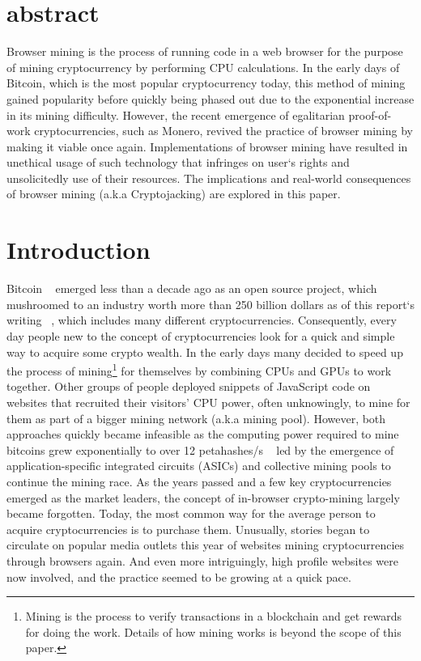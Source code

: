\section{abstract}

Browser mining is the process of running code in a web browser for the purpose of mining  cryptocurrency by performing CPU calculations. In the early days of Bitcoin, which is the most popular cryptocurrency today, this method of mining gained popularity before quickly being phased out due to the exponential increase in its mining difficulty. However, the recent emergence of egalitarian proof-of-work cryptocurrencies, such as Monero, revived the practice of browser mining by making it viable once again. Implementations of browser mining have resulted in unethical usage of such technology that infringes on user`s rights and unsolicitedly use of their resources. The implications and real-world consequences of browser mining (a.k.a Cryptojacking) are explored in this paper.

\section{Introduction}

Bitcoin ~\cite{nakamoto2008bitcoin} emerged less than a decade ago as an open source project, which mushroomed to an industry worth more than 250 billion dollars as of this report`s writing ~\cite{coinmarketcap}, which includes many different cryptocurrencies. Consequently, every day people new to the concept of cryptocurrencies look for a quick and simple way to acquire some crypto wealth. In the early days many decided to speed up the process of mining\footnote{Mining is the process to verify transactions in a blockchain and get rewards for doing the work. Details of how mining works is beyond the scope of this paper.} for themselves by combining CPUs and GPUs to work together. Other groups of people deployed snippets of JavaScript code on websites that recruited their visitors’ CPU power, often unknowingly, to mine for them as part of a bigger mining network (a.k.a mining pool). However, both approaches quickly became infeasible as the computing power required to mine bitcoins grew exponentially to over 12 petahashes/s ~\cite{blockchaininfohashrate} led by the emergence of application-specific integrated circuits (ASICs) and collective mining pools to continue the mining race. As the years passed and a few key cryptocurrencies emerged as the market leaders, the concept of in-browser crypto-mining largely became forgotten. Today, the most common way for the average person to acquire cryptocurrencies is to purchase them. Unusually, stories began to circulate on popular media outlets this year of websites mining cryptocurrencies through browsers again. And even more intriguingly, high profile websites were now involved, and the practice seemed to be growing at a quick pace.

